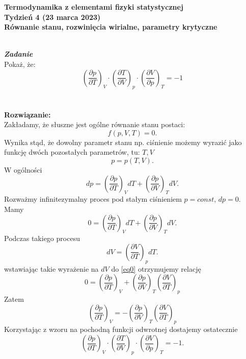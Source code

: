\documentclass[11pt,a4paper]{article}
\newcounter{zadanie}\newcommand{\zadanie}[1][]{\addtocounter{zadanie}{1} ~\\  {\bf \emph{Zadanie \arabic{zadanie} #1 }} \\}
\newcommand{\Partial}[3]{\left( \frac{\partial #1}{\partial #2} \right)_{#3}}
\begin{document}

\begin{centering}
\bf{\Large{Termodynamika z elementami fizyki statystycznej}}\\
Tydzień 4  (23 marca 2023)\\[3mm]
Równanie stanu, rozwinięcia wirialne, parametry krytyczne \\ 
\end{centering} 
\vspace{5mm}

\zadanie
Pokaż, że: \[ 
\left(\frac{\partial p}{\partial T}\right)_V \cdot
\left(\frac{\partial T}{\partial V}\right)_p \cdot
\left(\frac{\partial V}{\partial p}\right)_T = -1 
\]
\\
\\
\textbf{Rozwiązanie:}
\\
Zakładamy, że słuszne jest ogólne równanie stanu postaci:
\begin{equation*}
    f(p,V,T)=0.
\end{equation*}
Wynika stąd, że dowolny parametr stanu np. ciśnienie możemy wyrazić jako funkcję dwóch pozostałych parametrów, tu: $T,V$
\begin{equation*}
    p=p(T,V).
\end{equation*}
W ogólności
\begin{equation*}
    dp = \Partial{p}{T}{V}dT+\Partial{p}{V}{T}dV.
\end{equation*}
Rozważmy infinitezymalny proces pod stałym ciśnieniem $p=const, \, dp=0$. Mamy
\begin{equation}
\label{eq0}
    0=\Partial{p}{T}{V}dT+\Partial{p}{V}{T}dV.
\end{equation}
Podczas takiego procesu
\begin{equation*}
    dV=\Partial{V}{T}{p}dT.
\end{equation*}
wstawiając takie wyrażenie na $dV$ do \eqref{eq0} otrzymujemy relację
\begin{equation*}
    0=\Partial{p}{T}{V}+\Partial{p}{V}{T}\Partial{V}{T}{p}
\end{equation*}
Zatem
\begin{equation*}
    \Partial{p}{T}{V}=-\Partial{p}{V}{T}\Partial{V}{T}{p}
\end{equation*}
Korzystając z wzoru na pochodną funkcji odwrotnej dostajemy ostatecznie
\[ 
\left(\frac{\partial p}{\partial T}\right)_V \cdot
\left(\frac{\partial T}{\partial V}\right)_p \cdot
\left(\frac{\partial V}{\partial p}\right)_T = -1.
\]
\end{document}
